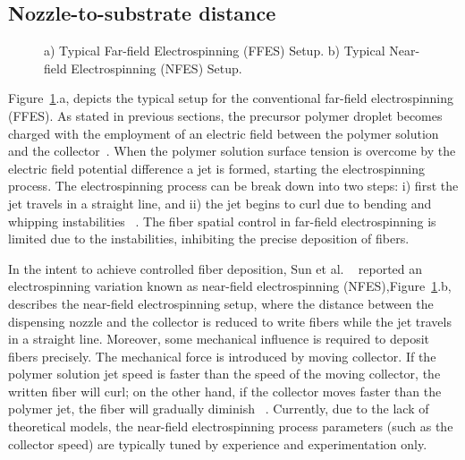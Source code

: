 \documentclass[5p,,preprint,12pt,twocolumn]{elsarticle}
\makeatletter
\def\fixFloatSize#1{}%
\makeatother
\begin{document}
\subsection{Nozzle-to-substrate distance}
\bgroup
\fixFloatSize{images/4cc65220-1457-4d0d-bb04-9b1c8138aa96-uffes_vs_nfes.png}
\begin{figure}[!htbp]
\centering \makeatletter{}
\makeatother 
\caption{{a) Typical Far-field Electrospinning (FFES) Setup. b) Typical Near-field Electrospinning (NFES) Setup.}}
\label{f-c34559531e3e}
\end{figure}
\egroup
Figure~\ref{f-c34559531e3e}.a, depicts the typical setup for the conventional far-field electrospinning (FFES). As stated in previous sections, the precursor polymer droplet becomes charged with the employment of an electric field between the polymer solution and the collector\unskip~\cite{527120:14135125}. When the polymer solution surface tension is overcome by the electric field potential difference a jet is formed, starting the electrospinning process. The electrospinning process can be break down into two steps: i) first the jet travels in a straight line, and ii) the jet begins to curl due to bending and whipping instabilities \unskip~\cite{527120:13444381,527120:14135543}. The fiber spatial control in far-field electrospinning is limited due to the instabilities, inhibiting the precise deposition of fibers.

In the intent to achieve controlled fiber deposition, Sun et al. \unskip~\cite{527120:11974321} reported an electrospinning variation known as near-field electrospinning (NFES),Figure~\ref{f-c34559531e3e}.b, describes the near-field electrospinning setup, where the distance between the dispensing nozzle and the collector is reduced to write fibers while the jet travels in a straight line. Moreover, some mechanical influence is required to deposit fibers precisely. The mechanical force is introduced by moving collector. If the polymer solution jet speed is faster than the speed of the moving collector, the written fiber will curl; on the other hand, if the collector moves faster than the polymer jet, the fiber will gradually diminish \unskip~\cite{527120:11974327,527120:11974326}. Currently, due to the lack of theoretical models, the near-field electrospinning process parameters (such as the collector speed) are typically tuned by experience and experimentation only.
\end{document}
